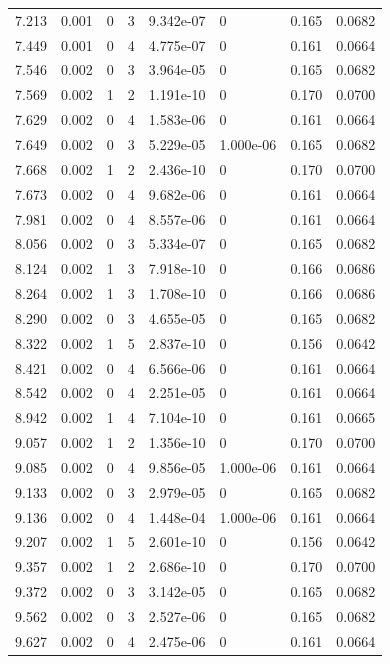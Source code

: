 \documentclass[preview]{standalone}
\begin{document}
{{{\begin{tabular}{L{1.2cm}C{1.2cm} C{0.3cm}C{0.5cm} C{1.4cm}C{1.4cm} C{1.4cm}C{1.4cm}}
  7.213  &  0.001  & 0     &  3 &  9.342e-07  & 0  & 0.165 &  0.0682   \\ 
  7.449  &  0.001  & 0     &  4 &  4.775e-07  & 0  & 0.161 &  0.0664   \\ 
  7.546  &  0.002  & 0     &  3 &  3.964e-05  & 0  & 0.165 &  0.0682   \\ 
  7.569  &  0.002  & 1     &  2 &  1.191e-10  & 0  & 0.170 &  0.0700   \\ 
  7.629  &  0.002  & 0     &  4 &  1.583e-06  & 0  & 0.161 &  0.0664   \\ 
  7.649  &  0.002  & 0     &  3 &  5.229e-05  & 1.000e-06  & 0.165 &  0.0682   \\ 
  7.668  &  0.002  & 1     &  2 &  2.436e-10  & 0  & 0.170 &  0.0700   \\ 
  7.673  &  0.002  & 0     &  4 &  9.682e-06  & 0  & 0.161 &  0.0664   \\ 
  7.981  &  0.002  & 0     &  4 &  8.557e-06  & 0  & 0.161 &  0.0664   \\ 
  8.056  &  0.002  & 0     &  3 &  5.334e-07  & 0  & 0.165 &  0.0682   \\ 
  8.124  &  0.002  & 1     &  3 &  7.918e-10  & 0  & 0.166 &  0.0686   \\ 
  8.264  &  0.002  & 1     &  3 &  1.708e-10  & 0  & 0.166 &  0.0686   \\ 
  8.290  &  0.002  & 0     &  3 &  4.655e-05  & 0  & 0.165 &  0.0682   \\ 
  8.322  &  0.002  & 1     &  5 &  2.837e-10  & 0  & 0.156 &  0.0642   \\ 
  8.421  &  0.002  & 0     &  4 &  6.566e-06  & 0  & 0.161 &  0.0664   \\ 
  8.542  &  0.002  & 0     &  4 &  2.251e-05  & 0  & 0.161 &  0.0664   \\ 
  8.942  &  0.002  & 1     &  4 &  7.104e-10  & 0  & 0.161 &  0.0665   \\ 
  9.057  &  0.002  & 1     &  2 &  1.356e-10  & 0  & 0.170 &  0.0700   \\ 
  9.085  &  0.002  & 0     &  4 &  9.856e-05  & 1.000e-06  & 0.161 &  0.0664   \\ 
  9.133  &  0.002  & 0     &  3 &  2.979e-05  & 0  & 0.165 &  0.0682   \\ 
  9.136  &  0.002  & 0     &  4 &  1.448e-04  & 1.000e-06  & 0.161 &  0.0664   \\ 
  9.207  &  0.002  & 1     &  5 &  2.601e-10  & 0  & 0.156 &  0.0642   \\ 
  9.357  &  0.002  & 1     &  2 &  2.686e-10  & 0  & 0.170 &  0.0700   \\ 
  9.372  &  0.002  & 0     &  3 &  3.142e-05  & 0  & 0.165 &  0.0682   \\ 
  9.562  &  0.002  & 0     &  3 &  2.527e-06  & 0  & 0.165 &  0.0682   \\ 
  9.627  &  0.002  & 0     &  4 &  2.475e-06  & 0  & 0.161 &  0.0664   \\ 
\hline 
\end{tabular} 

}}}
\end{document}
